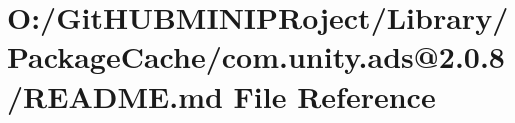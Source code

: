 \hypertarget{_library_2_package_cache_2com_8unity_8ads_0D2_80_88_2_r_e_a_d_m_e_8md}{}\section{O\+:/\+Git\+H\+U\+B\+M\+I\+N\+I\+P\+Roject/\+Library/\+Package\+Cache/com.unity.\+ads@2.0.8/\+R\+E\+A\+D\+ME.md File Reference}
\label{_library_2_package_cache_2com_8unity_8ads_0D2_80_88_2_r_e_a_d_m_e_8md}
